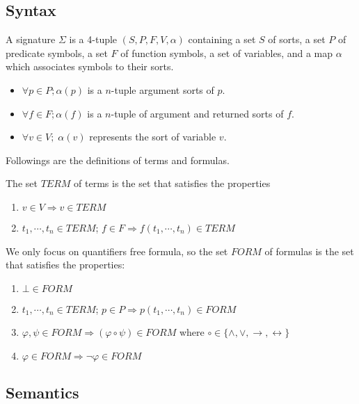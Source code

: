 \subsection{Syntax} \label{subsection:smt-syntax}
\begin{definition}
A signature $\Sigma$ is a 4-tuple $(S, P, F, V, \alpha)$ containing a set $S$ of sorts, a set $P$ of predicate symbols, a set $F$ of function symbols, a set of variables, and a map $\alpha$ which associates symbols to their sorts.
\begin{itemize}
\item $\forall p \in P; \alpha(p)$ is a $n$-tuple argument sorts of $p$.
\item $\forall f \in F; \alpha(f)$ is a $n$-tuple of argument and returned sorts of $f$.
\item $\forall v \in V; \; \alpha(v)$ represents the sort of variable $v$.
\end{itemize}
\end{definition}
 
Followings are the definitions of terms and formulas.

\begin{definition}
The set $TERM$ of terms is the set that satisfies the properties
\begin{enumerate}
\item $v \in V \Rightarrow v \in TERM$
\item $t_1,\cdots,t_n \in TERM$; $f \in F \Rightarrow f(t_1,\cdots, t_n) \in TERM$
\end{enumerate}
\end{definition}

\begin{definition}
We only focus on quantifiers free formula, so the set $FORM$ of formulas is the set that satisfies the properties:
\begin{enumerate}
\item $\bot \in FORM$
\item $t_1,\cdots,t_n \in TERM$; $p \in P \Rightarrow p(t_1,\cdots, t_n) \in FORM$
\item $\varphi, \psi \in FORM \Rightarrow (\varphi \circ \psi) \in FORM$ where $\circ \in \{\wedge, \vee, \rightarrow, \leftrightarrow\}$
\item $\varphi \in FORM \Rightarrow \neg\varphi \in FORM$
\end{enumerate}
\end{definition}

\subsection{Semantics}

